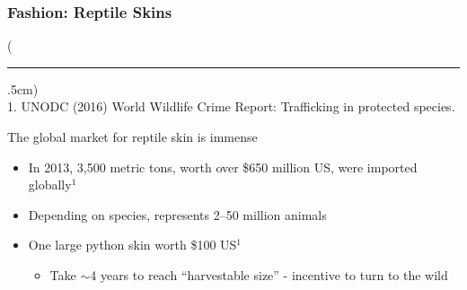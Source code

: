 \documentclass[10pt]{beamer}
\newenvironment{reference}[2]{%
	\begin{textblock*}{\textwidth}(#1,#2)
		\tiny\bgroup\color{gray}}{\egroup\end{textblock*}}
\begin{document}
\begin{frame}[t]
\frametitle{Fashion: Reptile Skins}
\vspace{0.5cm}

	\begin{reference}{4mm}{92mm}
		\rule{1.5cm}{0.25pt}\\
		1. UNODC (2016) World Wildlife Crime Report: Trafficking in protected species.
	\end{reference}
	
	The global market for reptile skin is immense\\
	\medskip
		\begin{itemize}
			\item In 2013, 3,500 metric tons, worth over \$650 million US, were imported globally$^{1}$
			\medskip
			\item Depending on species, represents 2--50 million animals
			\medskip
			\item One large python skin worth \$100 US$^{1}$
				\begin{itemize}
					\item Take $\sim$4 years to reach ``harvestable size'' - incentive to turn to the wild
				\end{itemize}
		\end{itemize}
\end{frame}
\end{document}
